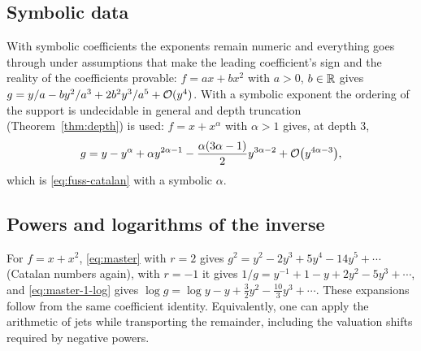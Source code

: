 \subsection{Symbolic data}

With symbolic coefficients the exponents remain numeric and everything goes through under assumptions that make the leading coefficient's sign and the reality of the coefficients provable: $f=ax+bx^2$ with $a>0$, $b\in\mathbb R$ gives $g=y/a-by^2/a^3+2b^2y^3/a^5+\mathcal O(y^4)$. With a symbolic exponent the ordering of the support is undecidable in general and depth truncation (Theorem~\ref{thm:depth}) is used: $f=x+x^\alpha$ with $\alpha>1$ gives, at depth $3$,
\[
 g=y-y^\alpha+\alpha y^{2\alpha-1}-\frac{\alpha(3\alpha-1)}{2}y^{3\alpha-2}+\mathcal O\bigl(y^{4\alpha-3}\bigr),
\]
which is \eqref{eq:fuss-catalan} with a symbolic $\alpha$.

\subsection{Powers and logarithms of the inverse}

For $f=x+x^2$, \eqref{eq:master} with $r=2$ gives $g^2=y^2-2y^3+5y^4-14y^5+\cdots$ (Catalan numbers again), with $r=-1$ it gives $1/g=y^{-1}+1-y+2y^2-5y^3+\cdots$, and \eqref{eq:master-1-log} gives $\log g=\log y-y+\tfrac32y^2-\tfrac{10}3y^3+\cdots$. These expansions follow from the same coefficient identity. Equivalently, one can apply the arithmetic of jets while transporting the remainder, including the valuation shifts required by negative powers.
